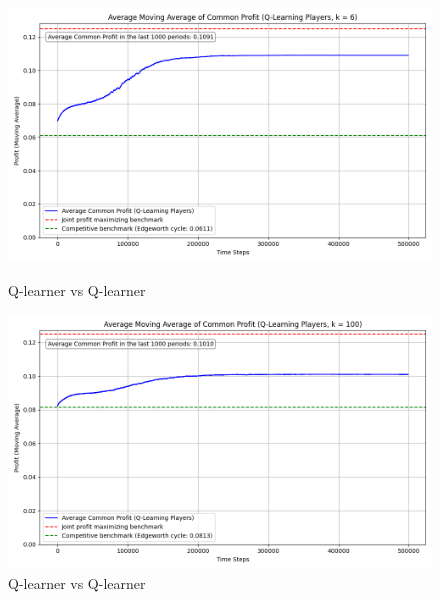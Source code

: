 \documentclass{article}
\begin{document}
\begin{figure}[H]
    \centering
    \begin{minipage}{0.75\linewidth}
        \centering
        \includegraphics[width=\linewidth]{K=6.png}
        \caption{Q-learner vs Q-learner }
        \label{fig: K = 6}
    \end{minipage}
    \hfill
    \begin{minipage}{0.75\linewidth}
        \centering
        \includegraphics[width=\linewidth]{K=100.png} %
        \caption{Q-learner vs Q-learner }
        \label{fig: K = 100}
    \end{minipage}
\end{figure}
\end{document}
